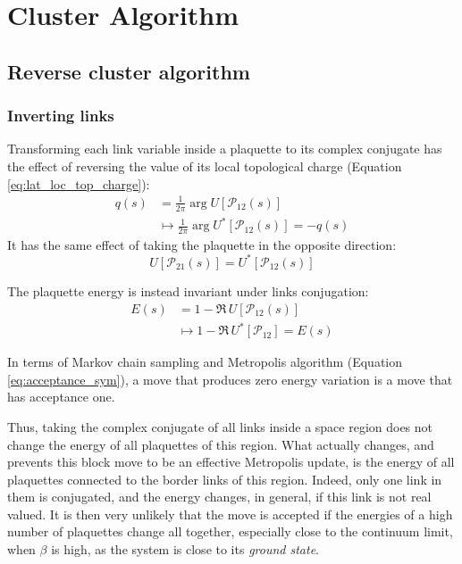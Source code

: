 \chapter{Cluster Algorithm}\label{ch:cluster}

\section{Reverse cluster algorithm}

\subsection*{Inverting links}

Transforming each link variable inside a plaquette to its complex conjugate
has the effect of reversing the value of its local topological charge (Equation \eqref{eq:lat_loc_top_charge}):
\[\begin{aligned}
    q(s) &= \frac{1}{2\pi}\arg U[\mathcal P_{12}(s)] \\
         &\mapsto \frac{1}{2\pi}\arg U^*[\mathcal P_{12}(s)] = -q(s)
\end{aligned}\]
It has the same effect of taking the plaquette in the opposite direction:
\[
    U[\mathcal P_{21}(s)] = U^*[\mathcal P_{12}(s)]
\]

The plaquette energy is instead invariant under links conjugation:
\[\begin{aligned}
    E(s) &= 1-\Re\,U[\mathcal P_{12}(s)] \\
         &\mapsto 1-\Re\,U^*[\mathcal P_{12}] = E(s)
\end{aligned}\]

In terms of Markov chain sampling and Metropolis algorithm (Equation \ref{eq:acceptance_sym}),
a move that produces zero energy variation is a move that has acceptance one.

Thus, taking the complex conjugate of all links inside a space region does not change the energy of all plaquettes of this region.
What actually changes, and prevents this block move to be an effective Metropolis update,
is the energy of all plaquettes connected to the border links of this region.
Indeed, only one link in them is conjugated, and the energy changes, in general, if this link is not real valued.
It is then very unlikely that the move is accepted if the energies of a high number of plaquettes change all together,
especially close to the continuum limit, when $\beta$ is high, as the system is close to its \emph{ground state}.

